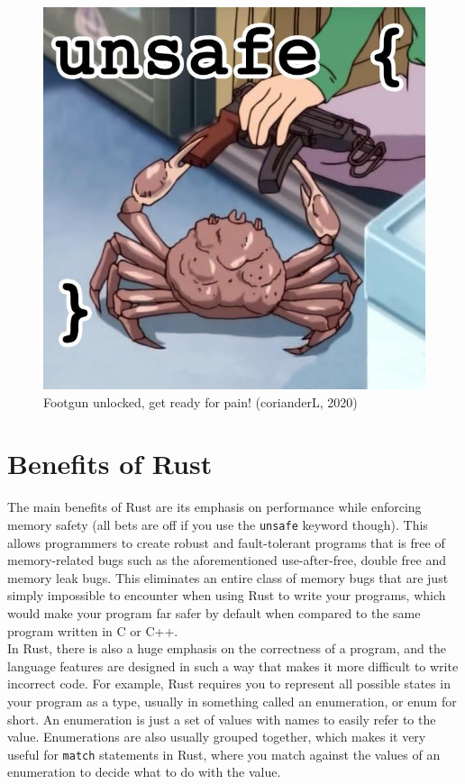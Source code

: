 \documentclass[11pt]{article}
\makeatletter
\newcommand{\citeprocitem}[2]{\hyper@linkstart{cite}{citeproc_bib_item_#1}#2\hyper@linkend}
\makeatother
\begin{document}
\begin{figure}[htbp]
\centering
\includegraphics[width=.9\linewidth]{./images/what-it-feels-like-to-use-unsafe.jpg}
\caption{Footgun unlocked, get ready for pain! (\citeprocitem{9}{corianderL, 2020})}
\end{figure}

 \newpage

\section{Benefits of Rust}
\label{sec:orgd2312d3}
The main benefits of Rust are its emphasis on
performance while enforcing memory safety
(all bets are off if you use the \texttt{unsafe}
keyword though). This allows programmers to
create robust and fault-tolerant programs that
is free of memory-related bugs such as the
aforementioned use-after-free, double free
and memory leak bugs. This eliminates an
entire class of memory bugs that are
just simply impossible to encounter when
using Rust to write your programs, which
would make your program far safer by default
when compared to the same program written
in C or C++.  \\

In Rust, there is also a huge emphasis on the
correctness of a program, and the language
features are designed in such a way that
makes it more difficult to write incorrect code.
For example, Rust requires you to represent
all possible states in your program as a type,
usually in something called an enumeration,
or enum for short. An enumeration is just a
set of values with names to easily refer to
the value. Enumerations are also usually grouped
together, which makes it very useful for \texttt{match}
statements in Rust, where you match against
the values of an enumeration to decide
what to do with the value.
\end{document}
